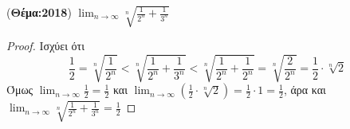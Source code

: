         \item ({\bfseries Θέμα:2018}) $ \lim_{n \to \infty} 
          \sqrt[n]{\frac{1}{2^{n}}+ \frac{1}{3^{n}}} $ 
          \begin{proof}
            Ισχύει ότι 
            \[
              \frac{1}{2} = \sqrt[n]{\frac{1}{2^{n}}} < 
              \sqrt[n]{\frac{1}{2^{n}} + \frac{1}{3^{n}} } < 
              \sqrt[n]{\frac{1}{2^{n}} + \frac{1}{2^{n}}} = 
              \sqrt[n]{\frac{2}{2^{n}}} = \frac{1}{2} \cdot \sqrt[n]{2} 
            \] 
            Όμως $ \lim_{n \to \infty} \frac{1}{2} = \frac{1}{2} $ και 
            $ \lim_{n \to \infty} \left(\frac{1}{2} \cdot \sqrt[n]{2}\right) = 
            \frac{1}{2} \cdot 1 = \frac{1}{2} $, άρα και 
            $ \lim_{n \to \infty} \sqrt[n]{\frac{1}{2^{n}} + \frac{1}{3^{n}}} = 
            \frac{1}{2}  $
          \end{proof}


